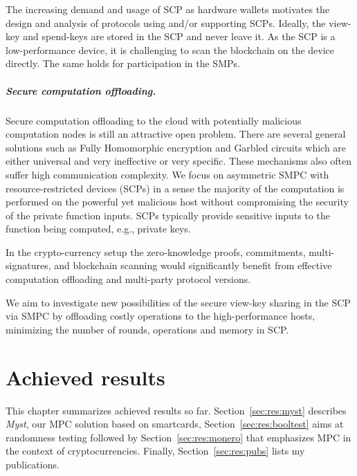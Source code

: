 \documentclass[
  digital, %
  twoside, %
  table,   %
  lof,     %
  lot,     %
]{fithesis3}
\newcounter{ph4_show_guides}
\theoremstyle{definition}
\theoremstyle{remark}
\begin{document}
\begin{ecmmnt}
The increasing demand and usage of SCP as hardware wallets motivates the design and analysis of protocols using and/or supporting SCPs. Ideally, the view-key and spend-keys are stored in the SCP and never leave it. As the SCP is a low-performance device, it is challenging to scan the blockchain on the device directly. The same holds for participation in the SMPs.

\paragraph{Secure computation offloading.}
Secure computation offloading to the cloud with potentially malicious computation nodes is still an attractive open problem. There are several general solutions such as Fully Homomorphic encryption and Garbled circuits which are either universal and very ineffective or very specific. These mechanisms also often suffer high communication complexity. 
We focus on asymmetric SMPC with resource-restricted devices (SCPs) in a sense the majority of the computation is performed on the powerful yet malicious host without compromising the security of the private function inputs. SCPs typically provide sensitive inputs to the function being computed, e.g., private keys. 

In the crypto-currency setup the zero-knowledge proofs, commitments, multi-signatures, and blockchain scanning would significantly benefit from effective computation offloading and multi-party protocol versions.

We aim to investigate new possibilities of the secure view-key sharing in the SCP via SMPC by offloading costly operations to the high-performance hosts, minimizing the number of rounds, operations and memory in SCP.
\end{ecmmnt}


\chapter{Achieved results}\label{chapter:results}
This chapter summarizes achieved results so far. Section~\ref{sec:res:myst} describes \emph{Myst}, our MPC solution based on smartcards, Section~\ref{sec:res:booltest} aims at randomness testing followed by Section~\ref{sec:res:monero} that emphasizes MPC in the context of cryptocurrencies. Finally, Section~\ref{sec:res:pubs} lists my publications.
\end{document}
